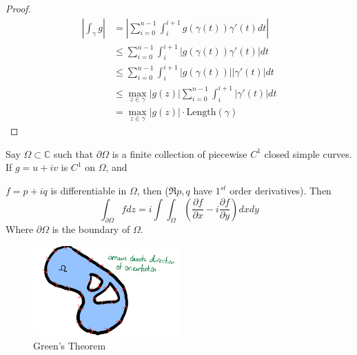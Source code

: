 \begin{proof}
    \begin{align*}
        |\int_{\gamma}g| & = |\sum_{i=0}^{n-1}\int_{i}^{i+1} g(\gamma(t)) \gamma'(t) dt|                \\
                         & \leq \sum_{i=0}^{n-1}\int_{i}^{i+1} |g(\gamma(t)) \gamma'(t)| dt             \\
                         & \leq \sum_{i=0}^{n-1}\int_{i}^{i+1} |g(\gamma(t))| |\gamma'(t)| dt           \\
                         & \leq \max_{z \in \gamma}|g(z)|\sum_{i=0}^{n-1}\int_{i}^{i+1} |\gamma'(t)| dt \\
                         & = \max_{z \in \gamma}|g(z)| \cdot \text{Length}(\gamma)
    \end{align*}
\end{proof}


\begin{theorem}
    Say $ \Omega \subset \mathbb{C} $ such that $\partial \Omega$ is a finite collection of piecewise $C^1$ closed simple curves. If $g = u + iv$ is $C^1$ on $\Omega$, and

    $f = p + iq$ is differentiable in $\Omega$, then ($\Re{p, q}$ have $1^{st}$ order derivatives). Then
    $$\int_{\partial \Omega} f dz = i \int\int_{\Omega} \left( \frac{\partial f}{\partial x} - i\frac{\partial f}{\partial y} \right) dxdy$$
    Where $\partial \Omega$ is the boundary of $\Omega$.
\end{theorem}

\begin{figure}[H]
    \centering
    \includegraphics[width=0.5\textwidth]{LECTURE_4/green.png}
    \caption{Green's Theorem}
\end{figure}

